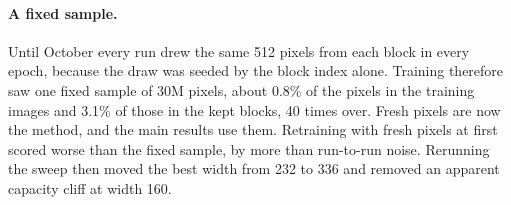 \paragraph{A fixed sample.}
Until October every run drew the same 512 pixels from each block in every epoch, because the draw was seeded by the block index alone. Training therefore saw one fixed sample of 30M pixels, about 0.8\% of the pixels in the training images and 3.1\% of those in the kept blocks, 40 times over. Fresh pixels are now the method, and the main results use them. Retraining with fresh pixels at first scored worse than the fixed sample, by more than run-to-run noise. Rerunning the sweep then moved the best width from 232 to 336 and removed an apparent capacity cliff at width 160.

